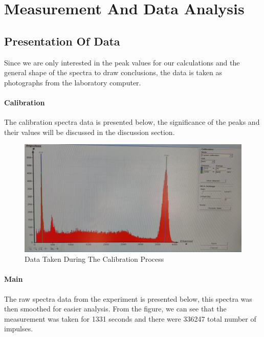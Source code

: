 \section{Measurement And Data Analysis}

	\subsection{Presentation Of Data}
		Since we are only interested in the peak values for our calculations and the general shape of the spectra to draw conclusions, the data is taken as photographs from the laboratory computer.
		\paragraph{Calibration}
			The calibration spectra data is presented below, the significance of the peaks and their values will be discussed in the discussion section.
		
			\begin{figure}[h]
				\caption{Data Taken During The Calibration Process}
				\centering
				\includegraphics[width=\textwidth * 2/ 2]{images/calibration_spectra.png}
			\end{figure}
		
		\paragraph{Main}
		The raw spectra data from the experiment is presented below, this spectra was then smoothed for easier analysis. From the figure, we can see that the measurement was taken for 1331 seconds and there were 336247 total number of impulses.
		\\
		\\
		
